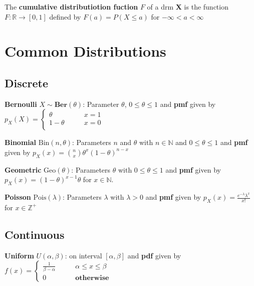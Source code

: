 \documentclass[5pt]{article}
\begin{document}
\begin{definition}
The \textbf{cumulative distributiotion fuction} $F$ of a drm \textbf{X} is the function $F: \mathbb{R}\to [0,1]$ defined by $F(a) = P(X \leq a)$ for $-\infty < a < \infty$
\end{definition}

\section{Common Distributions}
\subsection{Discrete}
\begin{definition}
\textbf{Bernoulli} $X \sim \textbf{Ber}(\theta)$: Parameter $\theta$, $0 \leq \theta \leq 1$ and \textbf{pmf} given by
$
p_X(X)=
\begin{cases}
\theta &\qquad x = 1\\
1 - \theta &\qquad x = 0\\ 
\end{cases}$
\end{definition}

\begin{definition}
\textbf{Binomial} $\text{Bin}(n,\theta)$: Parameters $n$ and $\theta$ with $n \in \mathbb{N}$ and $0 \leq \theta \leq 1$ and \textbf{pmf} given by $p_X(x) = {n \choose x}\theta^x(1-\theta)^{n-x}$
\end{definition}

\begin{definition}
\textbf{Geometric} $\text{Geo}(\theta)$: Parameters $\theta$ with $0 \leq \theta \leq 1$ and \textbf{pmf} given by $p_X(x) = (1-\theta)^{x-1} \theta$ for $x \in \mathbb{N}.$
\end{definition}

\begin{definition} 
\textbf{Poisson} $\text{Pois}(\lambda)$: Parameters $\lambda$ with $\lambda > 0$ and \textbf{pmf} given by $p_X(x) = \frac{e^{-\lambda}\lambda^x}{x!}$ for $x \in \mathbb{Z}^+$
\end{definition}
\subsection{Continuous}
\begin{definition}
\textbf{Uniform} $U(\alpha,\beta)$: on interval $[\alpha,\beta]$ and \textbf{pdf} given by $f(x) = \begin{cases}
\frac{1}{\beta - \alpha} \qquad & \alpha \leq x \leq \beta\\
0 &\textbf{otherwise}
\end{cases}$
\end{definition}
\end{document}
